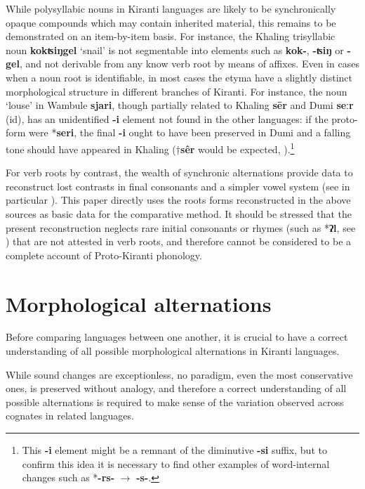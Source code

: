 \documentclass[oneside,a4paper,11pt]{article}
\newcommand{\ipa}[1]{\textbf{{\phon\mbox{#1}}}} %
\newcommand{\change}[2]{*\ipa{#1} $\rightarrow$ \ipa{#2}}
\begin{document}
While polysyllabic nouns in Kiranti languages are likely to be synchronically opaque compounds which may contain inherited material, this remains to be demonstrated on an item-by-item basis.  For instance, the Khaling trisyllabic noun \ipa{kokʦiŋgel} `snail' is not segmentable into elements such as \ipa{kok-}, \ipa{-ʦiŋ} or \ipa{-gel}, and not derivable from any know verb root by means of affixes. Even in cases when a noun root is identifiable, in most cases the etyma have a slightly distinct morphological structure in different branches of Kiranti. For instance, the noun `louse' in Wambule \ipa{sjari}, though partially related to Khaling \ipa{sēr} and Dumi \ipa{seːr} (id), has an unidentified \ipa{-i} element not found in the other languages: if the proto-form were *\ipa{seri}, the final \ipa{-i} ought to have been preserved in Dumi and a falling tone should have appeared in Khaling ($\dagger$\ipa{sêr} would be expected, \citealt{jacques16tonogenesis}).\footnote{This \ipa{-i} element might be a remnant of the diminutive \ipa{-si} suffix, but to confirm this idea it is necessary to find other examples of word-internal changes such as \change{-rs-}{-s-}. }

For verb roots by contrast, the wealth of synchronic alternations provide data to reconstruct lost contrasts in final consonants and a simpler vowel system (see in particular \citealt{michailovsky02dico, jacques12khaling, michailovsky12dumi}). This paper directly uses the roots forms reconstructed in the above sources as basic data for the comparative method. It should be stressed that the present reconstruction neglects rare initial consonants or rhymes (such as *\ipa{ʔl}, see \citealt{opgenort04implosives}) that are not attested in verb roots, and therefore cannot be considered to be a complete account of Proto-Kiranti phonology.


\section{Morphological alternations} \label{sec:alternations}
Before comparing languages between one another, it is crucial to have a correct understanding of all possible morphological alternations in Kiranti languages. 

While sound changes are exceptionless, no paradigm, even the most conservative ones, is preserved without analogy, and therefore a correct understanding of all possible alternations is required to make sense of the variation observed across cognates in related languages.
\end{document}
